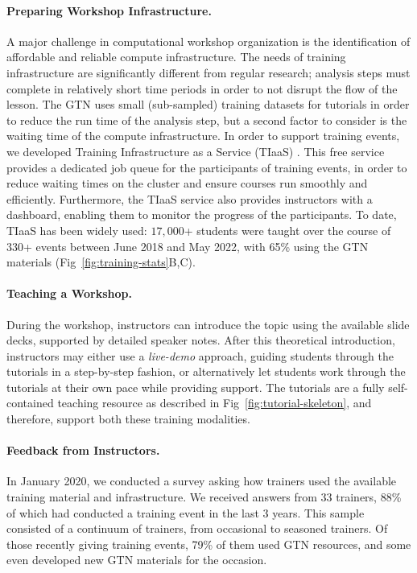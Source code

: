 \paragraph{Preparing Workshop Infrastructure.} A major challenge in computational workshop organization is the identification of affordable and reliable compute infrastructure. The needs of training infrastructure are significantly different from regular research; analysis steps must complete in relatively short time periods in order to not disrupt the flow of the lesson. The GTN uses small (sub-sampled) training datasets for tutorials in order to reduce the run time of the analysis step, but a second factor to consider is the waiting time of the compute infrastructure. 
In order to support training events, we developed Training Infrastructure as a Service (TIaaS) \cite{Rasche2020}. This free service provides a dedicated job queue for the participants of training events, in order to reduce waiting times on the cluster and ensure courses run smoothly and efficiently. Furthermore, the TIaaS service also provides instructors with a dashboard, enabling them to monitor the progress of the participants. To date, TIaaS has been widely used: $17,000$+ students were taught over the course of 330+ events between June 2018 and May 2022, with 65\% using the GTN materials (Fig~\ref{fig:training-stats}B,C).

\paragraph{Teaching a Workshop.} During the workshop, instructors can introduce the topic using the available slide decks, supported by detailed speaker notes. After this theoretical introduction, instructors may either use a \emph{live-demo} approach, guiding students through the tutorials in a step-by-step fashion, or alternatively let students work through the tutorials at their own pace while providing support. The tutorials are a fully self-contained teaching resource as described in Fig~\ref{fig:tutorial-skeleton}, and therefore, support both these training modalities. 

\paragraph{Feedback from Instructors.}
In January 2020, we conducted a survey asking how trainers used the available training material and infrastructure. We received answers from 33 trainers, 88\% of which had conducted a training event in the last 3 years.
This sample consisted of a continuum of trainers, from occasional to seasoned trainers. Of those recently giving training events, 79\% of them used GTN resources, and some even developed new GTN materials for the occasion. 

